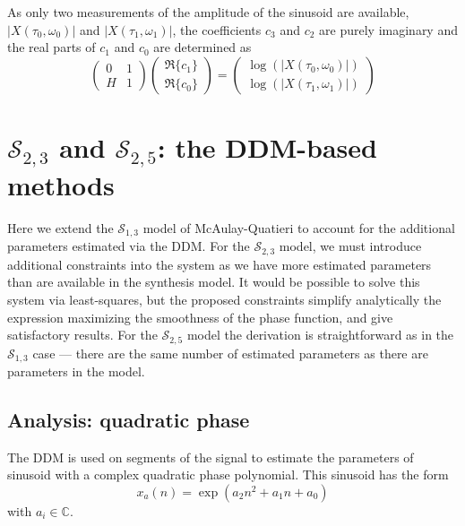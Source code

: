 As only two measurements of the amplitude of the sinusoid are available,
$|X(\tau_0,\omega_0)|$ and $|X(\tau_1,\omega_1)|$, the coefficients
$c_3$ and $c_2$ are purely imaginary and the real parts of $c_1$ and $c_0$ are
determined as
\begin{equation}
    \begin{pmatrix}
        0 & 1 \\
        H & 1
    \end{pmatrix}
    \begin{pmatrix}
        \Re\{c_1\} \\
        \Re\{c_0\}
    \end{pmatrix}
    =
    \begin{pmatrix}
        \log(|X(\tau_0,\omega_0)|) \\
        \log(|X(\tau_1,\omega_1)|)
    \end{pmatrix}
\end{equation}

\section{$\mathscr{S}_{2,3}$ and $\mathscr{S}_{2,5}$: the DDM-based methods}

Here we extend the $\mathscr{S}_{1,3}$ model of McAulay-Quatieri to account for
the additional parameters estimated via the DDM. For the $\mathscr{S}_{2,3}$
model, we must introduce additional constraints into the system as we have more
estimated parameters than are available in the synthesis model. It would be
possible to solve this system via least-squares, but the proposed constraints
simplify analytically the expression maximizing the smoothness of the phase
function, and give satisfactory results. For the $\mathscr{S}_{2,5}$ model the
derivation is straightforward as in the $\mathscr{S}_{1,3}$ case --- there are
the same number of estimated parameters as there are parameters in the model.

\subsection{Analysis: quadratic phase \label{sec:s235analysis}}

The DDM is used on segments of the signal to estimate the parameters of sinusoid
with a complex quadratic phase polynomial. This sinusoid has the form
\begin{equation}
    \label{eq:quadraticphasepoly}
    x_{a}(n) = \exp \left(a_2 n^{2} + a_1 n + a_0 \right)
\end{equation}
with $a_{i} \in \mathbb{C}$.

